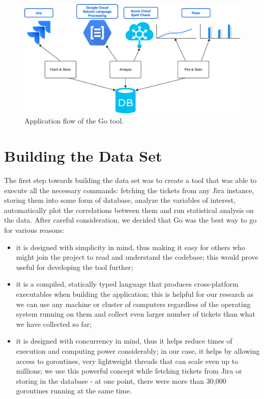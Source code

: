 \documentclass{mpaper}
\begin{document}
\begin{figure}
\begin{center}
\includegraphics[width=\textwidth]{images/flow.pdf}
\end{center}
\caption{\label{fig-eg}Application flow of the Go tool.}
\end{figure}

\section{Building the Data Set}\label{building}
The first step towards building the data set was to create a tool that was able to execute all the necessary commands:
fetching the tickets from any Jira instance, storing them into some form of database, analyze the variables of interest, 
automatically plot the correlations between them and run statistical analysis on the data. After careful consideration, 
we decided that Go was the best way to go for various reasons:
  \begin{itemize}
    \item it is designed with simplicity in mind, thus making it easy for others who might join the project to read 
    and understand the codebase; this would prove useful for developing the tool further;
    \item it is a compiled, statically typed language that produces cross-platform executables when building the application;
    this is helpful for our research as we can use any machine or cluster of computers regardless of the operating system 
    running on them and collect even larger number of tickets than what we have collected so far;
    \item it is designed with concurrency in mind, thus it helps reduce times of execution and computing power considerably;
    in our case, it helps by allowing access to goroutines, very lightweight threads that can scale even up to 
    millions; we use this powerful concept while fetching tickets from Jira or storing in the database - at one point, there were 
    more than 30,000 goroutines running at the same time.
  \end{itemize}
\end{document}
